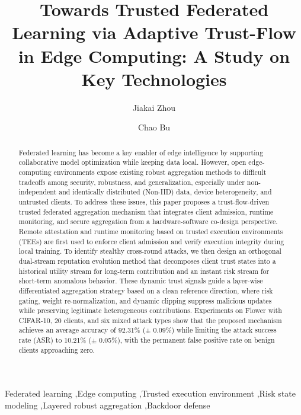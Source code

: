 \documentclass[final,5p,times,twocolumn]{elsarticle/elsarticle}
\begin{document}
\begin{frontmatter}

    \title{Towards Trusted Federated Learning via Adaptive Trust-Flow in Edge Computing: A Study on Key Technologies}

    \author[inst1]{Jiakai Zhou}
    \author[inst1]{Chao Bu}



    \begin{abstract}
        Federated learning has become a key enabler of edge intelligence by
        supporting collaborative model optimization while keeping data local.
        However, open edge-computing environments expose existing robust aggregation
        methods to difficult tradeoffs among security, robustness, and
        generalization, especially under non-independent and identically distributed
        (Non-IID) data, device heterogeneity, and untrusted clients. To address
        these issues, this paper proposes a trust-flow-driven trusted federated
        aggregation mechanism that integrates client admission, runtime monitoring,
        and secure aggregation from a hardware-software co-design perspective.
        Remote attestation and runtime monitoring based on trusted execution
        environments (TEEs) are first used to enforce client admission and verify
        execution integrity during local training. To identify stealthy cross-round
        attacks, we then design an orthogonal dual-stream reputation evolution
        method that decomposes client trust states into a historical utility stream
        for long-term contribution and an instant risk stream for short-term
        anomalous behavior. These dynamic trust signals guide a layer-wise
        differentiated aggregation strategy based on a clean reference direction,
        where risk gating, weight re-normalization, and dynamic clipping suppress
        malicious updates while preserving legitimate heterogeneous contributions.
        Experiments on Flower with CIFAR-10, 20 clients, and six mixed attack types
        show that the proposed mechanism achieves an average accuracy of 92.31\%
        ($\pm$ 0.09\%) while limiting the attack success rate (ASR) to 10.21\%
        ($\pm$ 0.05\%), with the permanent false positive rate on benign clients
        approaching zero.
    \end{abstract}

    \begin{keyword}
        Federated learning \sep Edge computing \sep Trusted execution environment \sep Risk state modeling \sep Layered robust aggregation \sep Backdoor defense
    \end{keyword}

\end{frontmatter}
\end{document}
